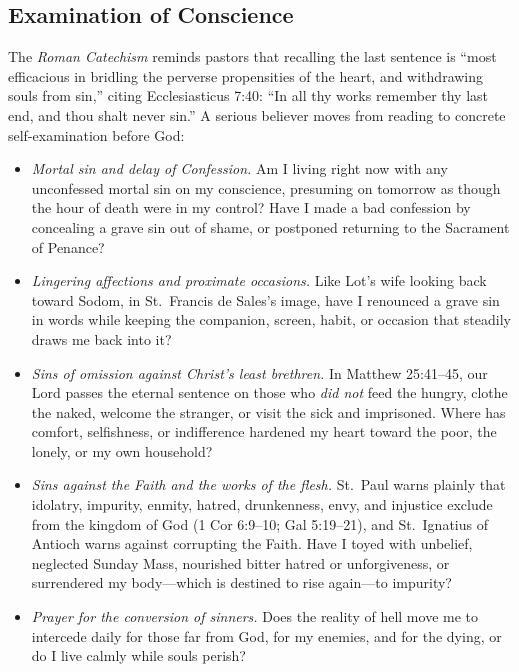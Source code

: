 \subsection*{Examination of Conscience}

The \textit{Roman Catechism} reminds pastors that recalling the last sentence is ``most efficacious in bridling the perverse propensities of the heart, and withdrawing souls from sin,'' citing Ecclesiasticus 7:40: ``In all thy works remember thy last end, and thou shalt never sin.'' A serious believer moves from reading to concrete self-examination before God:

\begin{itemize}
\item \textit{Mortal sin and delay of Confession.} Am I living right now with any unconfessed mortal sin on my conscience, presuming on tomorrow as though the hour of death were in my control? Have I made a bad confession by concealing a grave sin out of shame, or postponed returning to the Sacrament of Penance?
\item \textit{Lingering affections and proximate occasions.} Like Lot's wife looking back toward Sodom, in St.\ Francis de Sales's image, have I renounced a grave sin in words while keeping the companion, screen, habit, or occasion that steadily draws me back into it?
\item \textit{Sins of omission against Christ's least brethren.} In Matthew 25:41--45, our Lord passes the eternal sentence on those who \textit{did not} feed the hungry, clothe the naked, welcome the stranger, or visit the sick and imprisoned. Where has comfort, selfishness, or indifference hardened my heart toward the poor, the lonely, or my own household?
\item \textit{Sins against the Faith and the works of the flesh.} St.\ Paul warns plainly that idolatry, impurity, enmity, hatred, drunkenness, envy, and injustice exclude from the kingdom of God (1 Cor 6:9--10; Gal 5:19--21), and St.\ Ignatius of Antioch warns against corrupting the Faith. Have I toyed with unbelief, neglected Sunday Mass, nourished bitter hatred or unforgiveness, or surrendered my body---which is destined to rise again---to impurity?
\item \textit{Prayer for the conversion of sinners.} Does the reality of hell move me to intercede daily for those far from God, for my enemies, and for the dying, or do I live calmly while souls perish?
\end{itemize}

